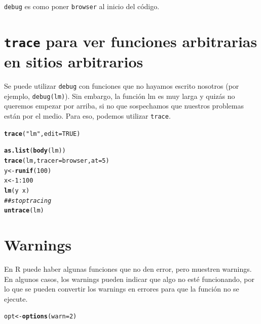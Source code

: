 \documentclass{config/apuntes}\usepackage[]{graphicx}\usepackage[]{xcolor}
\makeatletter
\newcommand{\hlnum}[1]{\textcolor[rgb]{0.686,0.059,0.569}{#1}}%
\newcommand{\hlsng}[1]{\textcolor[rgb]{0.192,0.494,0.8}{#1}}%
\newcommand{\hlcom}[1]{\textcolor[rgb]{0.678,0.584,0.686}{\textit{#1}}}%
\newcommand{\hlopt}[1]{\textcolor[rgb]{0,0,0}{#1}}%
\newcommand{\hldef}[1]{\textcolor[rgb]{0.345,0.345,0.345}{#1}}%
\newcommand{\hlkwb}[1]{\textcolor[rgb]{0.69,0.353,0.396}{#1}}%
\newcommand{\hlkwc}[1]{\textcolor[rgb]{0.333,0.667,0.333}{#1}}%
\newcommand{\hlkwd}[1]{\textcolor[rgb]{0.737,0.353,0.396}{\textbf{#1}}}%
\newenvironment{kframe}{%
 \def\at@end@of@kframe{}%
 \ifinner\ifhmode%
  \def\at@end@of@kframe{\end{minipage}}%
  \begin{minipage}{\columnwidth}%
 \fi\fi%
 \def\FrameCommand##1{\hskip\@totalleftmargin \hskip-\fboxsep
 \colorbox{shadecolor}{##1}\hskip-\fboxsep
     \hskip-\linewidth \hskip-\@totalleftmargin \hskip\columnwidth}%
 \MakeFramed {\advance\hsize-\width
   \@totalleftmargin\z@ \linewidth\hsize
   \@setminipage}}%
 {\par\unskip\endMakeFramed%
 \at@end@of@kframe}
\newenvironment{knitrout}{}{} %
\newcommand{\code}[1]{\texttt{#1}}
\makeatother
\begin{document}
\code{debug} es como poner \code{browser} al inicio del código.

\section{\code{trace} para ver funciones arbitrarias en sitios arbitrarios}
Se puede utilizar \code{debug} con funciones que no hayamos escrito nosotros (por ejemplo, \code{debug(lm)}). Sin embargo, la función lm es muy larga y quizás no queremos empezar por arriba, si no que sospechamos que nuestros problemas están por el medio. Para eso, podemos utilizar \code{trace}.

\begin{knitrout}
\color{fgcolor}\begin{kframe}
\begin{alltt}
\hlkwd{trace}\hldef{(}\hlsng{"lm"}\hldef{,} \hlkwc{edit} \hldef{=} \hlnum{TRUE}\hldef{)}
\end{alltt}
\end{kframe}
\end{knitrout}

\begin{knitrout}
\color{fgcolor}\begin{kframe}
\begin{alltt}
\hlkwd{as.list}\hldef{(}\hlkwd{body}\hldef{(lm))}
\hlkwd{trace}\hldef{(lm,} \hlkwc{tracer} \hldef{= browser,} \hlkwc{at} \hldef{=} \hlnum{5}\hldef{)}
\hldef{y} \hlkwb{<-} \hlkwd{runif}\hldef{(}\hlnum{100}\hldef{)}
\hldef{x} \hlkwb{<-} \hlnum{1}\hlopt{:}\hlnum{100}
\hlkwd{lm}\hldef{(y} \hlopt{~} \hldef{x)}
\hlcom{## stop tracing}
\hlkwd{untrace}\hldef{(lm)}
\end{alltt}
\end{kframe}
\end{knitrout}

\section{Warnings}
En R puede haber algunas funciones que no den error, pero muestren warnings. En algunos casos, los warnings pueden indicar que algo no esté funcionando, por lo que se pueden convertir los warnings en errores para que la función no se ejecute. 

\begin{knitrout}
\color{fgcolor}\begin{kframe}
\begin{alltt}
\hldef{opt} \hlkwb{<-} \hlkwd{options}\hldef{(}\hlkwc{warn} \hldef{=} \hlnum{2}\hldef{)}
\end{alltt}
\end{kframe}
\end{knitrout}
\end{document}

